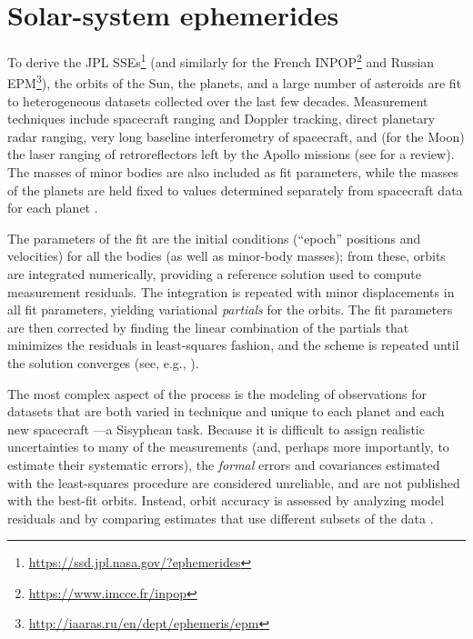 \documentclass{aastex63}
\begin{document}
\section{Solar-system ephemerides}
\label{sec:sses}

To derive the JPL SSEs\footnote{\href{https://ssd.jpl.nasa.gov/?ephemerides}{https://ssd.jpl.nasa.gov/?ephemerides}} (and similarly for the French INPOP\footnote{\href{https://www.imcce.fr/inpop}{https://www.imcce.fr/inpop}} and Russian EPM\footnote{\href{http://iaaras.ru/en/dept/ephemeris/epm}{http://iaaras.ru/en/dept/ephemeris/epm}}),
the orbits of the Sun, the planets, and a large number of asteroids are fit to heterogeneous datasets collected over the last few decades. Measurement techniques include spacecraft ranging and Doppler tracking, direct planetary radar ranging, very long baseline interferometry of spacecraft, and (for the Moon) the laser ranging of retroreflectors left by the Apollo missions (see \citealt{verma2013} for a review). The masses of minor bodies are also included as fit parameters, while the masses of the planets are held fixed to values determined separately from spacecraft data for each planet \citep{jh+2000,2006AJ....132.2520J,2014AJ....148...76J,2009AJ....137.4322J}.

The parameters of the fit are the initial conditions (``epoch'' positions and velocities) for all the bodies (as well as minor-body masses); from these, orbits are integrated numerically, providing a reference solution used to compute measurement residuals.
The integration is repeated with minor displacements in all fit parameters, yielding variational \emph{partials} for the orbits. The fit parameters are then corrected by finding the linear combination of the partials that minimizes the residuals in least-squares fashion, and the scheme is repeated until the solution converges (see, e.g., \citealt{1983A&A...125..150N}).

The most complex aspect of the process is the modeling of observations for datasets that are both varied in technique and unique to each planet and each new spacecraft \citep{moyer2003}---a Sisyphean task. Because it is difficult to assign realistic uncertainties to many of the measurements (and, perhaps more importantly, to estimate their systematic errors), the \emph{formal} errors and covariances estimated with the least-squares procedure are considered unreliable, and are not published with the best-fit orbits. Instead, orbit accuracy is assessed by analyzing model residuals and by comparing estimates that use different subsets of the data \citep{de434cov,de438}.
\end{document}
